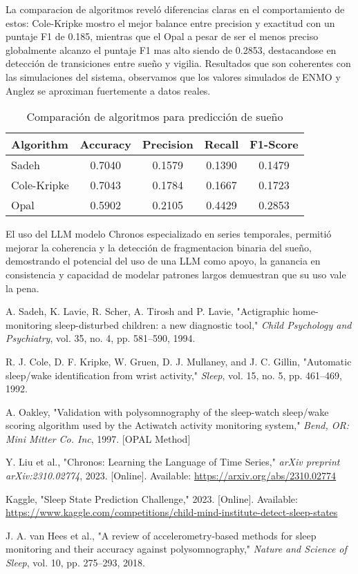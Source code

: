 \documentclass[conference]{IEEEtran}
\begin{document}
La comparacion de algoritmos reveló diferencias claras en el comportamiento de estos: Cole-Kripke mostro el mejor balance entre precision y exactitud con un puntaje F1 de 0.185, mientras que el Opal a pesar de ser el menos preciso globalmente alcanzo el puntaje F1 mas alto siendo de 0.2853, destacandose en detección de transiciones entre sueño y vigilia. Resultados que son coherentes con las simulaciones del sistema, observamos que los valores simulados de ENMO y Anglez se aproximan fuertemente a datos reales.

\begin{table}[H]
\centering
\caption{Comparación de algoritmos para predicción de sueño}
\begin{tabular}{|l|c|c|c|c|}
\hline
\textbf{Algorithm} & \textbf{Accuracy} & \textbf{Precision} & \textbf{Recall} & \textbf{F1-Score} \\
\hline
Sadeh        & 0.7040 & 0.1579 & 0.1390 & 0.1479 \\
Cole-Kripke  & 0.7043 & 0.1784 & 0.1667 & 0.1723 \\
Opal         & 0.5902 & 0.2105 & 0.4429 & 0.2853 \\
\hline
\end{tabular}
\label{tab:alg_comparison}
\end{table}
El uso del LLM modelo Chronos especializado en series temporales, permitió mejorar la coherencia y la detección de fragmentacion binaria del sueño, demostrando el potencial del uso de una LLM como apoyo, la ganancia en consistencia y capacidad de modelar patrones largos demuestran que su uso vale la pena.

\begin{thebibliography}{99}

A. Sadeh, K. Lavie, R. Scher, A. Tirosh and P. Lavie,
"Actigraphic home-monitoring sleep-disturbed children: a new diagnostic tool,"
\textit{Child Psychology and Psychiatry}, vol. 35, no. 4, pp. 581–590, 1994.

R. J. Cole, D. F. Kripke, W. Gruen, D. J. Mullaney, and J. C. Gillin,
"Automatic sleep/wake identification from wrist activity,"
\textit{Sleep}, vol. 15, no. 5, pp. 461–469, 1992.

A. Oakley,
"Validation with polysomnography of the sleep-watch sleep/wake scoring algorithm used by the Actiwatch activity monitoring system,"
\textit{Bend, OR: Mini Mitter Co. Inc}, 1997. [OPAL Method]

Y. Liu et al., "Chronos: Learning the Language of Time Series," 
\textit{arXiv preprint arXiv:2310.02774}, 2023. [Online]. Available: \url{https://arxiv.org/abs/2310.02774}

Kaggle, "Sleep State Prediction Challenge," 2023. [Online]. Available: \url{https://www.kaggle.com/competitions/child-mind-institute-detect-sleep-states}

J. A. van Hees et al., 
"A review of accelerometry-based methods for sleep monitoring and their accuracy against polysomnography,"
\textit{Nature and Science of Sleep}, vol. 10, pp. 275–293, 2018.

\end{thebibliography}
\end{document}
